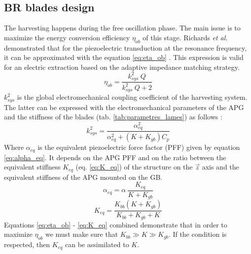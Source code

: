 \documentclass[3p,twocolumn,preprint]{elsarticle}
\begin{document}
	\subsection{BR blades design}	
	\label{subsec:BR blades design}
The harvesting happens during the free oscillation phase. The main issue is to maximize the energy conversion efficiency $\eta_{ob}$ of this stage. Richards \emph{et al.} demonstrated that for the piezoelectric transduction at the resonance frequency, it can be approximated with the equation \ref{eq:eta_ob} \cite{Richards2004}. This expression is valid for an electric extraction based on the adaptive impedance matching strategy.
\begin{equation}
	\eta_{ob} = \dfrac{k^2_{sys}\ Q}{k^2_{sys}\ Q + 2}
	\label{eq:eta_ob}
\end{equation}
$k^2_{sys}$ is the global electromechanical coupling coefficient of the harvesting system. The latter can be expressed with the electromechanical parameters of the APG and the stiffness of the blades (tab. \ref{tab:parametres_lames}) as follows :
\begin{equation}
	k^2_{sys} = \dfrac{\alpha^2_{eq}}{\alpha^2_{eq} + (K+K_{gb})C_p}
	\label{eq:k2_sys}
\end{equation}
Where $\alpha_{eq}$ is the equivalent piezoelectric force factor (PFF) given by equation \ref{eq:alpha_eq}. It depends on the APG PFF and on the ratio between the equivalent stiffness $K_{eq}$ (eq. \ref{eq:K_eq}) of the structure on the $\vec{z}$ axis and the equivalent stiffness of the APG mounted on the GB.
\begin{equation}
	\alpha_{eq} = \alpha\ \dfrac{K_{eq}}{K + K_{gb}} 
	\label{eq:alpha_eq}
\end{equation}
\begin{equation}
	K_{eq} = \dfrac{K_{bb}(K + K_{gb})}{K_{bb} + K_{gb} + K}
	\label{eq:K_eq}
\end{equation}
Equations \ref{eq:eta_ob} - \ref{eq:K_eq} combined demonstrate that in order to maximize $\eta_{ob}$ we must make sure that $K_{bb} \gg K \gg K_{gb}$. If the condition is respected, then $K_{eq}$ can be assimilated to $K$. 
\end{document}
